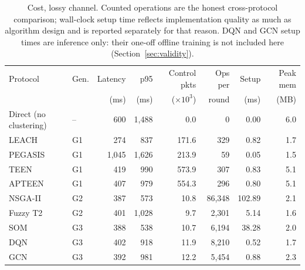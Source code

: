 \begin{table}[!t]
\caption{Cost, lossy channel. Counted operations are the honest cross-protocol comparison; wall-clock setup time reflects implementation quality as much as algorithm design and is reported separately for that reason. DQN and GCN setup times are inference only: their one-off offline training is not included here (Section~\ref{sec:validity}).}
\label{tab:cost}
\centering
\begin{tabular}{llrrrrrr}
\toprule
Protocol & Gen. & Latency & p95 & Control pkts & Ops per & Setup & Peak mem \\
 & & (ms) & (ms) & ($\times 10^3$) & round & (ms) & (MB) \\
\midrule
Direct (no clustering) & -- & 600 & 1,488 & 0.0 & 0 & 0.00 & 6.0 \\
LEACH & G1 & 274 & 837 & 171.6 & 329 & 0.82 & 1.7 \\
PEGASIS & G1 & 1,045 & 1,626 & 213.9 & 59 & 0.05 & 1.5 \\
TEEN & G1 & 419 & 990 & 573.9 & 307 & 0.83 & 5.1 \\
APTEEN & G1 & 407 & 979 & 554.3 & 296 & 0.80 & 5.1 \\
NSGA-II & G2 & 387 & 573 & 10.8 & 86,348 & 102.89 & 2.1 \\
Fuzzy T2 & G2 & 401 & 1,028 & 9.7 & 2,301 & 5.14 & 1.6 \\
SOM & G3 & 388 & 538 & 10.7 & 6,194 & 38.28 & 2.0 \\
DQN & G3 & 402 & 918 & 11.9 & 8,210 & 0.52 & 1.7 \\
GCN & G3 & 392 & 981 & 12.2 & 5,454 & 0.88 & 2.3 \\
\bottomrule
\end{tabular}
\end{table}
